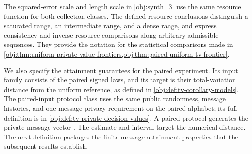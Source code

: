 The squared-error scale  and length scale  in \cref{obj:synth_3} use the same resource function for both collection classes. The defined resource conclusions distinguish a saturated range, an intermediate range, and a dense range, and express consistency and inverse-resource comparisons along arbitrary admissible sequences. They provide the notation for the statistical comparisons made in \cref{obj:thm:uniform-private-value-frontiers,obj:thm:paired-uniform-tv-frontier}.

We also specify the attainment guarantees for the paired experiment. Its input family  consists of the paired signed laws, and its target  is their total-variation distance from the uniform reference, as defined in \cref{obj:def:tv-corollary-models}. The paired-input protocol class  uses the same public randomness, message histories, and one-message privacy requirement on the paired alphabet; its full definition is in \cref{obj:def:tv-private-decision-values}. A paired protocol  generates the private message vector . The estimate  and interval  target the numerical distance. The next definition packages the finite-message attainment properties that the subsequent results establish.

